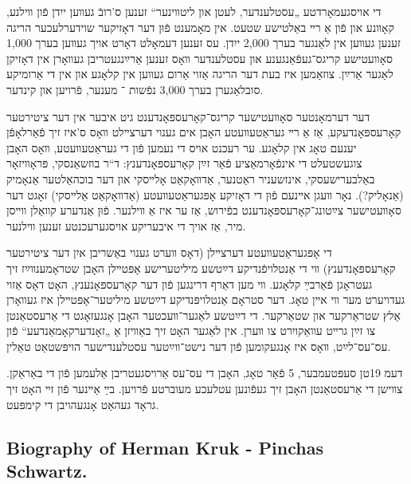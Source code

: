 \documentclass{article}
\begin{document}
\begin{pairs}
\begin{Rightside}
\begin{RTL}
\begin{hebrew}
די אויסגעמאָרדטע „עסטלענדער, לעטן און ליטװינער“ זענען ס'רובֿ געװען
ייִדן פֿון װילנע, קאָװנע און פֿון אַ רײ באַלטישע שטעט. אין מאָמענט פֿוּן דער
דאָזיקער שוידערלעכער הריגה זענען געװען אין לאַנגער בערך 2,000 ייִדן. עס
זענען דעמאָלט דאָרט אויך געװען בערך 1,000 סאָװעטישע קריגס־געפֿאַנגענע און
עסטלענדער װאָס זענען אַרײַנגעטריבן געװאָרן אין דאָזיקן לאַגער אַרײַן.
צוזאַמען איז בעת דער הריגה אַזוי אַרום געװען אין קלאָגע און אין די אַרומיקע
סובלאַגערן בערך 3,000 נפֿשות ־ מענער, פֿרויען און קינדער.

דער דערמאָנטער סאָװעטישער קריגס־קאָרעספּאָנדענט גיט איבער אין
דער ציטירטער קאָרעספּאָנדעקע, אַז אַ רײ געראַטעװעטע האָבן אים גענוי דערצײלט
װאָס ס'איז זיך פֿאַרלאָפֿן יענעם טאָג אין קלאָגע. ער רעכנט אויס די נעמען
פֿון די געראַטעװעטע, װאָס האָבן צוגעשטעלט די אינפֿאָרמאַציע פֿאַר זײַן קאָרעספּאָנדענץ:
 ד“ר בוזשאַנסקי, פּראָװיזאָר באַלבערישעסקי, אינזשעניר ראַטנער,
 אַדװאָקאַט אָלײסקי און דער בוכהאַלטער אַנאָמיק (אַנאָליק?). 
נאָר װעגן אײנעם פֿוּן די דאָזיקע אָפּגעראַטעװעטע (אַדװאָקאַט אַלײסקי) זאָגט דער סאָװעטישער
צײַטונג־קאָרעספּאָנדענט בפֿירוש, אַז ער איז אַ װילנער. פֿוּן אַנדערע קװאַלן
װײסן מיר, אַז אויך די איבעריקע אויסגערעכנטע זענען װילנער.

די אָפּגעראַטעװעטע דערצײלן (דאָס װערט גענוי באַשריבן איִן דער ציטירטער
 קאָרעספּאָנדענץ) װי די אַנטלויפֿנדיקע דײַטשע מיליטערישע אָפּטײלן
 האָבן שטראָמענװײַז זיך געטראָגן פֿאַרבײַ קלאָגע. װי מען דאַרף דרינגען פֿון
דער קאָרעספּאָנענץ, האָט דאָס אַזוי געדויערט מער װי אײן טאָג. דער סטראָם
אַנטלויפּנדיקע דײַטשע מיליטער־אָפּטײלן איז געװאָרן אַלץ שטראַרקער און שטאַרקער.
די דײַטשע לאַגער־װעכטער האָבן אָנגעזאָגט די אַרעסטאַנטן צו זײַן גרײט
עװאַקויִרט צו װערן. אין לאַגער האָט זיך באַװיזן אַ „זאָנדערקאָמאַנדעע“ פֿון
עס־עס־לײַט, װאָס איז אָנגעקומען פֿון דער נישט־װײַטער עסטלענדישער
הויפּשטאַט טאַלין.

דעמ 19טן סעפּטעמבער, 5 פֿאַר טאָג, האָבן די עס־עס אַרויסגעטריבן אַלעמען
פֿון די באַראַקן. צװישן די אַרעסטאַנטן האָבן זיך געפֿונען עטלעכע מעוברטע
פֿרויען. בײַ אַײנער פֿון זײ האָט זיך גראָד געהאַט אָנגעהויבן די קימפּעט.

\endnumbering
\end{hebrew}
\end{RTL}
\end{Rightside}


\begin{Leftside}
\begin{english}
\section{
Biography of Herman Kruk - Pinchas Schwartz. \\    }
\beginnumbering
\autopar


\end{english}
\end{Leftside}
\end{pairs}
\end{document}
